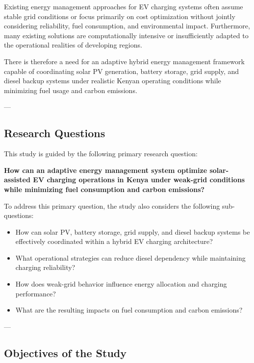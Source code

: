 Existing energy management approaches for EV charging systems often assume stable grid conditions or focus primarily on cost optimization without jointly considering reliability, fuel consumption, and environmental impact. Furthermore, many existing solutions are computationally intensive or insufficiently adapted to the operational realities of developing regions.

There is therefore a need for an adaptive hybrid energy management framework capable of coordinating solar PV generation, battery storage, grid supply, and diesel backup systems under realistic Kenyan operating conditions while minimizing fuel usage and carbon emissions.

---

\subsection{Research Questions}

This study is guided by the following primary research question:

\textbf{How can an adaptive energy management system optimize solar-assisted EV charging operations in Kenya under weak-grid conditions while minimizing fuel consumption and carbon emissions?}

To address this primary question, the study also considers the following sub-questions:

\begin{itemize}
    \item How can solar PV, battery storage, grid supply, and diesel backup systems be effectively coordinated within a hybrid EV charging architecture?
    
    \item What operational strategies can reduce diesel dependency while maintaining charging reliability?
    
    \item How does weak-grid behavior influence energy allocation and charging performance?
    
    \item What are the resulting impacts on fuel consumption and carbon emissions?
\end{itemize}

---

\subsection{Objectives of the Study}


